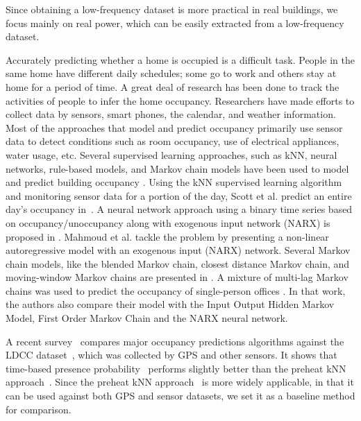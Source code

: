 Since obtaining a low-frequency dataset is more practical in real buildings, 
we focus mainly on real power, which can be easily extracted 
from a low-frequency dataset.  

Accurately predicting whether a home is occupied is a difficult task. 
People in the same home have different daily schedules; 
some go to work and others stay at home for a period of time.  
A great deal of research has been done to track the activities of people 
to infer the home occupancy. 
Researchers have made efforts to collect data by sensors, smart phones, 
the calendar, and weather information. 
Most of the approaches that model and predict occupancy primarily use sensor data to detect conditions 
such as room occupancy, use of electrical appliances, water usage, etc.
Several supervised learning approaches, such as kNN, neural networks, rule-based models, 
and Markov chain models have been used to model and predict building occupancy 
\cite{scott2011preheat,alrazgan2011learning,mahmoud2013behavioural,erickson2010occupancy,beltran2014optimal}.  
Using the kNN supervised learning algorithm and monitoring sensor data 
for a portion of the day, 
Scott et al. predict an entire day's occupancy in~\cite{scott2011preheat}. 
A neural network approach using a binary time series based on 
occupancy/unoccupancy along with exogenous input network (NARX) is 
proposed in \cite{mahmoud2013behavioural}. 
Mahmoud et al. tackle the problem by presenting a non-linear autoregressive 
model with an exogenous input (NARX) network. 
Several Markov chain models, like the blended Markov chain, 
closest distance Markov chain, 
and moving-window Markov chains are presented in \cite{erickson2010occupancy}. 
A mixture of multi-lag Markov chains was used to predict the occupancy of 
single-person offices \cite{manna2013learning}. 
In that work, the authors also compare their model with the Input Output Hidden Markov Model, 
First Order Markov Chain and the NARX neural network. 

A recent survey~\cite{kleiminger2014predicting} compares major occupancy 
predictions algorithms against the LDCC dataset~\cite{kiukkonen2010towards}, which was collected by 
GPS and other sensors. 
It shows that time-based presence probability~\cite{krumm2011learning} performs slightly better than the preheat kNN approach~\cite{scott2011preheat}. 
Since the preheat kNN approach~\cite{scott2011preheat} is more widely applicable,  
in that it can be used against both GPS and sensor datasets, 
we set it as a baseline method for comparison. 

